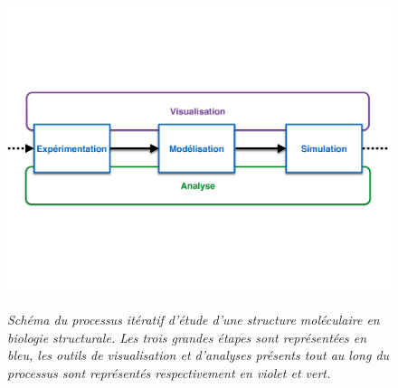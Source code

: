 \begin{figure}[h]
  \centering
  {\includegraphics[width=.75\linewidth]{./figures/ch1/process_bio_struct}}
    \caption[Schéma du processus itératif d'étude d'une structure moléculaire en biologie structurale.]{\it Schéma du processus itératif d'étude d'une structure moléculaire en biologie structurale. Les trois grandes étapes sont représentées en bleu, les outils de visualisation et d'analyses présents tout au long du processus sont représentés respectivement en violet et vert.}
  \label{Fig:process_bio_struct}
  \hspace{0.2cm}
\end{figure}

